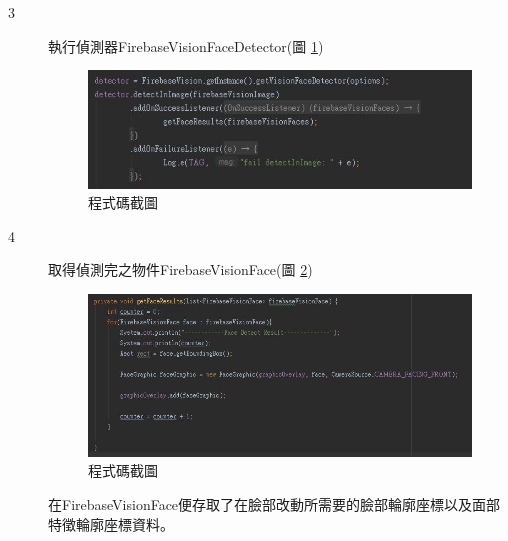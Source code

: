 \documentclass[12pt]{article}  %
\theoremstyle{plain}
\begin{document}
\begin{itemize}
\begin{description}
\item[3] 執行偵測器FirebaseVisionFaceDetector(圖 \ref{detector})
\begin{figure}[htbp]
\centering
\includegraphics[width=13cm]{pic/ch3/detector.JPG}
\caption{程式碼截圖} \label{detector}
\end{figure}

\item[4] 取得偵測完之物件FirebaseVisionFace(圖 \ref{FaceResult})
\begin{figure}[htbp]
\centering
\includegraphics[width=13cm]{pic/ch3/FaceResult.JPG}
\caption{程式碼截圖} \label{FaceResult}
\end{figure}
在FirebaseVisionFace便存取了在臉部改動所需要的臉部輪廓座標以及面部特徵輪廓座標資料。
\end{description}
\end{itemize}
\end{document}
